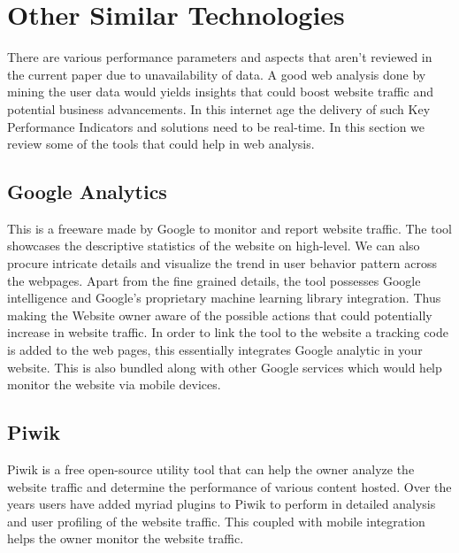 \section{Other Similar Technologies} \label{similartech}
There are various performance parameters and aspects that aren’t reviewed in the current paper due to unavailability of data. A good web analysis done by mining the user data would yields insights that could boost website traffic and potential business advancements. In this internet age the delivery of such Key Performance Indicators and solutions need to be real-time.  In this section we review some of the tools that could help in web analysis. 

\subsection{Google Analytics}
This is a freeware made by Google to monitor and report website traffic. The tool showcases the descriptive statistics of the website on high-level. We can also procure intricate details and visualize the trend in user behavior pattern across the webpages. Apart from the fine grained details, the tool possesses Google intelligence and Google’s proprietary machine learning library integration. Thus making the Website owner aware of the possible actions that could potentially increase in website traffic. In order to link the tool to the website a tracking code is added to the web pages, this essentially integrates Google analytic in your website. This is also bundled along with other Google services which would help monitor the website via mobile devices.

\subsection{Piwik}
Piwik is a free open-source utility tool that can help the owner analyze the website traffic and determine the performance of various content hosted. Over the years users have added myriad plugins to Piwik to perform in detailed analysis and user profiling of the website traffic. This coupled with mobile integration helps the owner monitor the website traffic.
